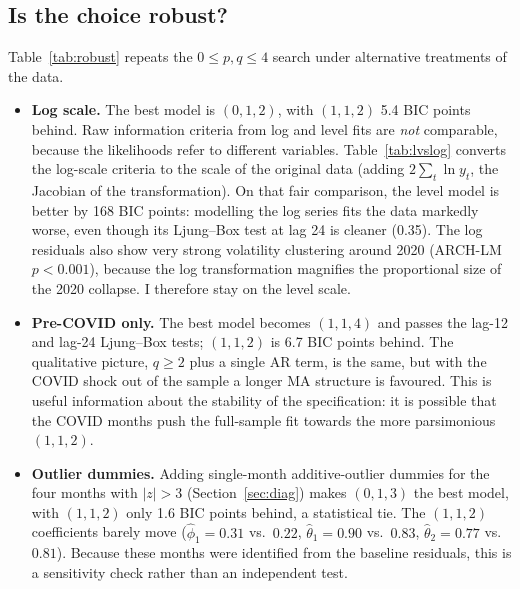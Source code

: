 \documentclass[11pt,a4paper]{article}
\begin{document}
\subsection{Is the choice robust?}
Table~\ref{tab:robust} repeats the $0\le p,q\le 4$ search under alternative treatments of the data.

\begin{itemize}
\item \textbf{Log scale.} The best model is $(0,1,2)$, with $(1,1,2)$ 5.4 BIC points behind. Raw information criteria from log and level fits are \emph{not} comparable, because the likelihoods refer to different variables. Table~\ref{tab:lvslog} converts the log-scale criteria to the scale of the original data (adding $2\sum_t\ln y_t$, the Jacobian of the transformation). On that fair comparison, the level model is better by 168 BIC points: modelling the log series fits the data markedly worse, even though its Ljung--Box test at lag 24 is cleaner (0.35). The log residuals also show very strong volatility clustering around 2020 (ARCH-LM $p<0.001$), because the log transformation magnifies the proportional size of the 2020 collapse. I therefore stay on the level scale.
\item \textbf{Pre-COVID only.} The best model becomes $(1,1,4)$ and passes the lag-12 and lag-24 Ljung--Box tests; $(1,1,2)$ is 6.7 BIC points behind. The qualitative picture, $q\ge2$ plus a single AR term, is the same, but with the COVID shock out of the sample a longer MA structure is favoured. This is useful information about the stability of the specification: it is possible that the COVID months push the full-sample fit towards the more parsimonious $(1,1,2)$.
\item \textbf{Outlier dummies.} Adding single-month additive-outlier dummies for the four months with $|z|>3$ (Section~\ref{sec:diag}) makes $(0,1,3)$ the best model, with $(1,1,2)$ only 1.6 BIC points behind, a statistical tie. The $(1,1,2)$ coefficients barely move ($\hat\phi_1=0.31$ vs.\ $0.22$, $\hat\theta_1=0.90$ vs.\ $0.83$, $\hat\theta_2=0.77$ vs.\ $0.81$). Because these months were identified from the baseline residuals, this is a sensitivity check rather than an independent test.
\end{itemize}

\end{document}
